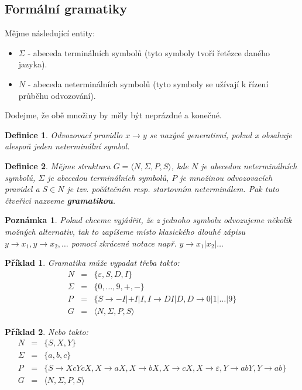 \documentclass[10pt, a4paper, titlepage]{article}
\theoremstyle{note}
\newtheorem{definice}{Definice}
\newtheorem{priklad}{Příklad}
\newtheorem{poznamka}{Poznámka}
\begin{document}
\subsection{Formální gramatiky}
Mějme následující entity:
\begin{itemize}
\item $\Sigma$ - abeceda terminálních symbolů (tyto symboly tvoří řetězce daného jazyka).
\item $N$ - abeceda neterminálních symbolů (tyto symboly se užívají k řízení průběhu odvozování).
\end{itemize}

Dodejme, že obě množiny by měly být neprázdné a konečné.

\begin{definice}
Odvozovací pravidlo $x \rightarrow y$ se nazývá \emph{generativní}, pokud \emph{x} obsahuje alespoň jeden neterminální symbol.
\end{definice}

\begin{definice}
Mějme strukturu $G = \langle N, \Sigma, P, S \rangle$, kde $N$ je abecedou neterminálních symbolů, $\Sigma$ je abecedou terminálních symbolů,
$P$ je množinou odvozovacích pravidel a $S \in N$ je tzv. \emph{počátečním} resp. \emph{startovním} neterminálem. Pak tuto čtveřici nazveme \textbf{gramatikou}.
\end{definice}

\begin{poznamka}
Pokud chceme vyjádřit, že z jednoho symbolu odvozujeme několik možných alternativ, tak to zapíšeme místo klasického dlouhé zápisu
$y \rightarrow x_{1}, y \rightarrow x_{2}, \ldots$ pomocí zkrácené notace např. $y \rightarrow x_{1}|x_{2}|\ldots$
\end{poznamka}

\begin{priklad}
Gramatika může vypadat třeba takto:
\begin{eqnarray*}
N &=& \lbrace \varepsilon, S, D, I \rbrace \\
\Sigma &=& \lbrace 0, \ldots, 9, +, - \rbrace \\
P &=& \lbrace S \rightarrow -I|+I|I, I \rightarrow DI|D, D \rightarrow 0|1|\ldots |9 \rbrace \\
G &=& \langle N, \Sigma, P, S \rangle
\end{eqnarray*}
\end{priklad}

\begin{priklad}\label{priklad-2}
Nebo takto:
\begin{eqnarray*}
N &=& \lbrace S, X, Y \rbrace \\
\Sigma &=& \lbrace a, b, c \rbrace \\
P &=& \lbrace S \rightarrow XcYcX, X \rightarrow aX, X \rightarrow bX, X \rightarrow cX, X \rightarrow \varepsilon,
Y \rightarrow abY, Y \rightarrow ab \rbrace \\
G &=& \langle N, \Sigma, P, S \rangle
\end{eqnarray*}
\end{priklad}
\end{document}
